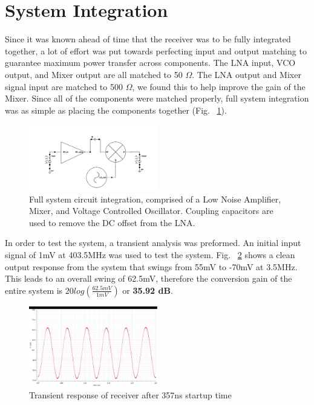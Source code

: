 \section{System Integration}
Since it was known ahead of time that the receiver was to be fully integrated together, a lot of effort was put towards perfecting input and output matching to guarantee maximum power transfer across components. The LNA input, VCO output, and Mixer output are all matched to 50 $\Omega$. The LNA output and Mixer signal input are matched to 500 $\Omega$, we found this to help improve the gain of the Mixer. Since all of the components were matched properly, full system integration was as simple as placing the components together (Fig. ~\ref{fig:fullsystem}). 

\begin{figure}[h]
   \centering
    \includegraphics[width=0.5\textwidth]{figures/FullSystem.png}
    \caption{Full system circuit integration, comprised of a Low Noise Amplifier, Mixer, and Voltage Controlled Oscillator. Coupling capacitors are used to remove the DC offset from the LNA. }
    \label{fig:fullsystem}
\end{figure}

In order to test the system, a transient analysis was preformed. An initial input signal of 1mV at 403.5MHz was used to test the system. Fig. ~\ref{fig:fullsystemtrans} shows a clean output response from the system that swings from 55mV to -70mV at 3.5MHz. This leads to an overall swing of 62.5mV, therefore the conversion gain of the entire system is $20log(\frac{62.5mV}{1mV})$ or {\bf 35.92 dB}.

\begin{figure}[h]
   \centering
    \includegraphics[width=0.5\textwidth]{figures/FullSystemTrans}
    \caption{Transient response of receiver after 357ns startup time}
    \label{fig:fullsystemtrans}
\end{figure}

